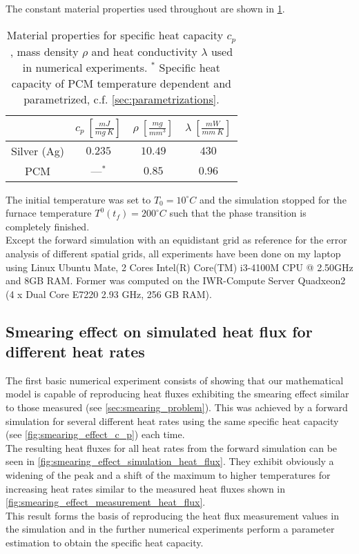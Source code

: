\documentclass{scrartcl}[12pt, halfparskip]
\numberwithin{equation}{section}
\numberwithin{figure}{section}
\numberwithin{table}{section}
\begin{document}
The constant material properties used throughout are shown in \cref{tab:const_material_properties}.

\begin{table}[H]
	\centering
	\begin{tabular}{| c | c | c | c |} \hline
		& $c_p \ [\frac{mJ}{mg \ K}]$ & $\rho \ [\frac{mg}{mm^3}]$ & $\lambda \ [\frac{mW}{mm \ K}]$ \\ \hline
		Silver (Ag) & $0.235$ & $10.49$ & $430$ \\
		PCM & ---$^*$ & $0.85$ & $0.96$ \\ \hline
	\end{tabular}
	\caption{Material properties for specific heat capacity $c_p$, mass density $\rho$ and heat conductivity $\lambda$ used in numerical experiments. $^*$ Specific heat capacity of PCM temperature dependent and parametrized, c.f. \cref{sec:parametrizations}.}
	\label{tab:const_material_properties}
\end{table}

The initial temperature was set to $T_0=10^\circ C$ and the simulation stopped for the furnace temperature $T^0(t_f)=200^\circ C$ such that the phase transition is completely finished. \\

Except the forward simulation with an equidistant grid as reference for the error analysis of different spatial grids, all experiments have been done on my laptop using Linux Ubuntu Mate, 2 Cores Intel(R) Core(TM) i3-4100M CPU @ 2.50GHz and 8GB RAM. Former was computed on the IWR-Compute Server Quadxeon2 (4 x Dual Core E7220 2.93 GHz, 256 GB RAM).


\subsection{Smearing effect on simulated heat flux for different heat rates}
The first basic numerical experiment consists of showing that our mathematical model is capable of reproducing heat fluxes exhibiting the smearing effect similar to those measured (see \cref{sec:smearing_problem}). This was achieved by a forward simulation for several different heat rates using  the same specific heat capacity (see \cref{fig:smearing_effect_c_p}) each time. \\
The resulting heat fluxes for all heat rates from the forward simulation can be seen in \cref{fig:smearing_effect_simulation_heat_flux}. They exhibit obviously a widening of the peak and a shift of the maximum to higher temperatures for increasing heat rates similar to the measured heat fluxes shown in \cref{fig:smearing_effect_measurement_heat_flux}. \\
This result forms the basis of reproducing the heat flux measurement values in the simulation and in the further numerical experiments perform a parameter estimation to obtain the specific heat capacity. 
\end{document}

